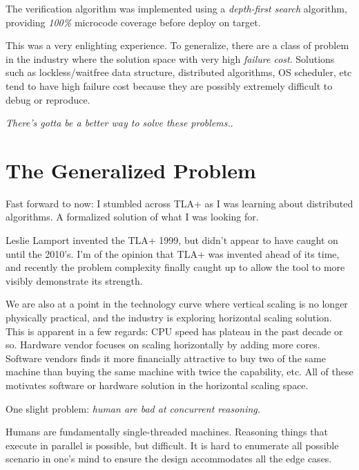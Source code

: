 \documentclass{report}
\begin{document}
The verification algorithm was implemented using a \textit{depth-first search}
algorithm, providing \textit{100\%} microcode coverage before deploy on
target.\newline

This was a very enlighting experience. To generalize, there are a class of
problem in the industry where the solution space with very high \textit{failure
cost}.  Solutions such as lockless/waitfree data structure, distributed
algorithms, OS scheduler, etc tend to have high failure cost because they are
possibly extremely difficult to debug or reproduce. \newline 

\textit{There's gotta be a better way to solve these problems.}. 

\section{The Generalized Problem}

Fast forward to now: I stumbled across TLA+ as I was learning about distributed
algorithms.  A formalized solution of what I was looking for.\newline

Leslie Lamport invented the TLA+ 1999, but didn't appear to have caught on until
the 2010's. I'm of the opinion that TLA+ was invented ahead of its time, and
recently the problem complexity finally caught up to allow the tool to more
visibly demonstrate its strength.\newline

We are also at a point in the technology curve where vertical scaling is no
longer physically practical, and the industry is exploring horizontal scaling
solution. This is apparent in a few regards: CPU speed has plateau in the past
decade or so. Hardware vendor focuses on scaling horizontally by adding more
cores. Software vendors finds it more financially attractive to buy two of the
same machine than buying the same machine with twice the capability, etc. All of
these motivates software or hardware solution in the horizontal scaling space.\newline

One slight problem: \textit{human are bad at concurrent reasoning.}\newline

Humans are fundamentally single-threaded machines. Reasoning things that execute
in parallel is possible, but difficult. It is hard to enumerate all possible
scenario in one's mind to ensure the design accommodates all the edge cases. 
\newline
\end{document}
